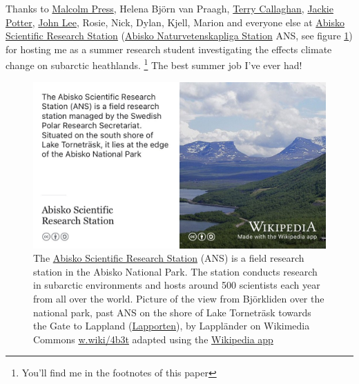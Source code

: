 \documentclass[
]{book}
\begin{document}
Thanks to \href{https://en.wikipedia.org/wiki/Malcolm_Press}{Malcolm Press}, Helena Björn van Praagh, \href{https://en.wikipedia.org/wiki/Terry_Callaghan}{Terry Callaghan}, \href{https://www.brookes.ac.uk/ocsld/about-ocsld/staff-profiles/jackie-potter/}{Jackie Potter}, \href{https://www.sheffield.ac.uk/biosciences/people/academic-staff/john-lee}{John Lee}, Rosie, Nick, Dylan, Kjell, Marion and everyone else at \href{https://en.wikipedia.org/wiki/Abisko_Scientific_Research_Station}{Abisko Scientific Research Station} (\href{https://sv.wikipedia.org/wiki/Abisko_naturvetenskapliga_station}{Abisko Naturvetenskapliga Station} ANS, see figure \ref{fig:abisko-fig}) for hosting me as a summer research student investigating the effects climate change on subarctic heathlands. \citep{subarctic}\footnote{You'll find me in the footnotes of this paper} The best summer job I've ever had!

\begin{figure}

{\centering \includegraphics[width=0.99\linewidth]{images/abisko} 

}

\caption{The \href{(https://en.wikipedia.org/wiki/Abisko_Scientific_Research_Station)}{Abisko Scientific Research Station} (ANS) is a field research station in the Abisko National Park. The station conducts research in subarctic environments and hosts around 500 scientists each year from all over the world. Picture of the view from Björkliden over the national park, past ANS on the shore of Lake Torneträsk towards the Gate to Lappland (\href{https://en.wikipedia.org/wiki/Lapporten}{Lapporten}), by Lappländer on Wikimedia Commons \href{https://w.wiki/4b3t}{w.wiki/4b3t} adapted using the \href{https://apps.apple.com/us/app/wikipedia/id324715238}{Wikipedia app}}\label{fig:abisko-fig}
\end{figure}
\end{document}
